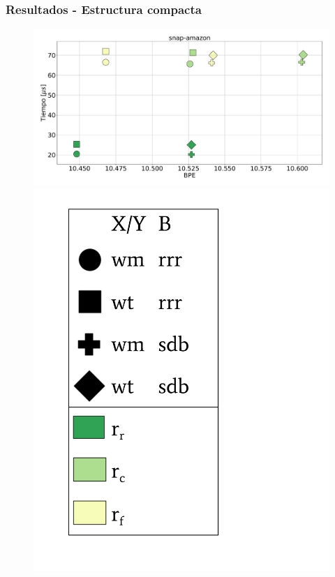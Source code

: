\begin{frame}
\frametitle{Resultados - Estructura compacta}

\begin{figure}
	\centering
	
    	\begin{minipage}{1\textwidth}
    		\centering
    		\begin{minipage}{0.8\textwidth}
    			\centering
    			\includegraphics[width=1\linewidth]{../img/sdsl/aleatorioBig/snap-amazon.pdf}
    		\end{minipage}
    		\begin{minipage}{0.15\textwidth}
    			\centering
    			\includegraphics[scale=.15, clip, trim=70 0 0 0]{../img/sdsl/label.pdf}
    		\end{minipage}	
    	\end{minipage}


\end{figure}
\end{frame}
